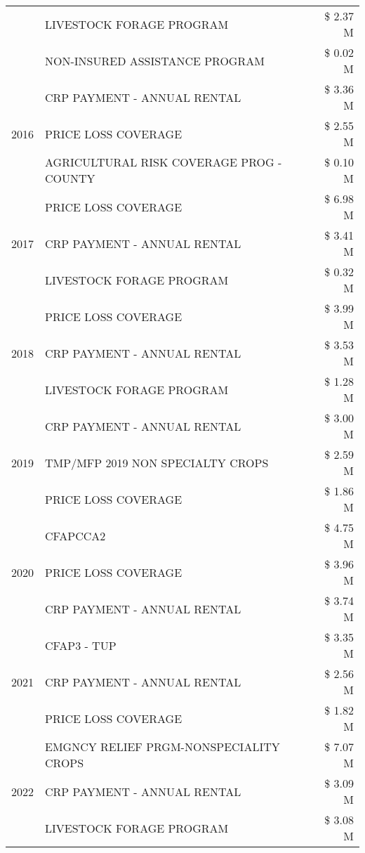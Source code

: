 \begin{tabular}{llr}
 & LIVESTOCK FORAGE PROGRAM & \$ 2.37 M \\
 & NON-INSURED ASSISTANCE PROGRAM & \$ 0.02 M \\
\cline{1-3}
\multirow[t]{3}{*}{2016} & CRP PAYMENT - ANNUAL RENTAL & \$ 3.36 M \\
 & PRICE LOSS COVERAGE & \$ 2.55 M \\
 & AGRICULTURAL RISK COVERAGE PROG - COUNTY & \$ 0.10 M \\
\cline{1-3}
\multirow[t]{3}{*}{2017} & PRICE LOSS COVERAGE & \$ 6.98 M \\
 & CRP PAYMENT - ANNUAL RENTAL & \$ 3.41 M \\
 & LIVESTOCK FORAGE PROGRAM & \$ 0.32 M \\
\cline{1-3}
\multirow[t]{3}{*}{2018} & PRICE LOSS COVERAGE & \$ 3.99 M \\
 & CRP PAYMENT - ANNUAL RENTAL & \$ 3.53 M \\
 & LIVESTOCK FORAGE PROGRAM & \$ 1.28 M \\
\cline{1-3}
\multirow[t]{3}{*}{2019} & CRP PAYMENT - ANNUAL RENTAL & \$ 3.00 M \\
 & TMP/MFP 2019 NON SPECIALTY CROPS & \$ 2.59 M \\
 & PRICE LOSS COVERAGE & \$ 1.86 M \\
\cline{1-3}
\multirow[t]{3}{*}{2020} & CFAPCCA2 & \$ 4.75 M \\
 & PRICE LOSS COVERAGE & \$ 3.96 M \\
 & CRP PAYMENT - ANNUAL RENTAL & \$ 3.74 M \\
\cline{1-3}
\multirow[t]{3}{*}{2021} & CFAP3 - TUP & \$ 3.35 M \\
 & CRP PAYMENT - ANNUAL RENTAL & \$ 2.56 M \\
 & PRICE LOSS COVERAGE & \$ 1.82 M \\
\cline{1-3}
\multirow[t]{3}{*}{2022} & EMGNCY RELIEF PRGM-NONSPECIALITY CROPS & \$ 7.07 M \\
 & CRP PAYMENT - ANNUAL RENTAL & \$ 3.09 M \\
 & LIVESTOCK FORAGE PROGRAM & \$ 3.08 M \\
\cline{1-3}
\bottomrule
\end{tabular}
